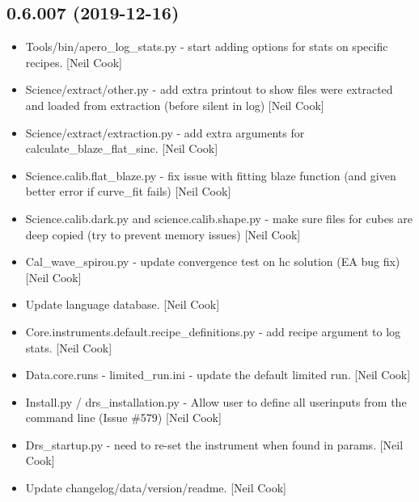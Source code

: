 \documentclass[a4paper,10pt,english]{report}
\begin{document}
\subsection{0.6.007 (2019-12-16)}
\label{\detokenize{misc/changelog:id10}}\begin{itemize}
\item {} 
Tools/bin/apero\_log\_stats.py - start adding options for stats on
specific recipes. {[}Neil Cook{]}

\item {} 
Science/extract/other.py - add extra printout to show files were
extracted and loaded from extraction (before silent in log) {[}Neil
Cook{]}

\item {} 
Science/extract/extraction.py - add extra arguments for
calculate\_blaze\_flat\_sinc. {[}Neil Cook{]}

\item {} 
Science.calib.flat\_blaze.py - fix issue with fitting blaze function
(and given better error if curve\_fit fails) {[}Neil Cook{]}

\item {} 
Science.calib.dark.py and science.calib.shape.py - make sure files for
cubes are deep copied (try to prevent memory issues) {[}Neil Cook{]}

\item {} 
Cal\_wave\_spirou.py - update convergence test on hc solution (EA bug
fix) {[}Neil Cook{]}

\item {} 
Update language database. {[}Neil Cook{]}

\item {} 
Core.instruments.default.recipe\_definitions.py - add recipe argument
to log stats. {[}Neil Cook{]}

\item {} 
Data.core.runs - limited\_run.ini - update the default limited run.
{[}Neil Cook{]}

\item {} 
Install.py / drs\_installation.py - Allow user to define all userinputs
from the command line (Issue \#579) {[}Neil Cook{]}

\item {} 
Drs\_startup.py - need to re-set the instrument when found in params.
{[}Neil Cook{]}

\item {} 
Update changelog/data/version/readme. {[}Neil Cook{]}

\end{itemize}
\end{document}
